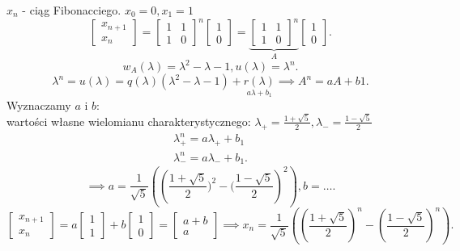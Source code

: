 \documentclass[../main.tex]{subfiles}
\begin{document}
\begin{przyklad}
    $x_n$ - ciąg Fibonacciego. $x_0 = 0, x_1 = 1$
    \[
    \begin{bmatrix}
    x_{n+1}\\
    x_{n}
\end{bmatrix} =
\begin{bmatrix}
1 & 1\\
1 & 0\end{bmatrix}^n
\begin{bmatrix}
1\\
0\end{bmatrix} =
\underbrace{
\begin{bmatrix}
1 & 1\\
1 & 0\end{bmatrix}^n}_{A}
\begin{bmatrix}
1\\
0\end{bmatrix}
    .\]
    \[
        w_A(\lambda) = \lambda^2 - \lambda - 1, u(\lambda) = \lambda^n
    .\]
    \[
        \lambda^n = u(\lambda) = q(\lambda)(\lambda^2 - \lambda - 1) + \underset{a\lambda+b_1}{r(\lambda)} \implies A^n = a A + b 1
    .\]
    Wyznaczamy $a$ i $b$:\\
    wartości własne wielomianu charakterystycznego: $\lambda_{+} = \frac{1+\sqrt{5}}{2}, \lambda_{-} = \frac{1-\sqrt{5}}{2}$ \\
    \begin{align*}
        \lambda_{+}^n = a \lambda_{+} + b_1\\
        \lambda_{-}^n = a \lambda_{-} + b_1
    .\end{align*} \[
        \implies a = \frac{1}{\sqrt{5} } \left ( \left (\frac{1+\sqrt{5} }{2})^2 - (\frac{1-\sqrt{5} }{2} \right )^2\right ), b = \ldots
    .\]
    \[
    \begin{bmatrix}
    x_{n+1}\\
    x_{n}
    \end{bmatrix} =
    a \begin{bmatrix}
    1\\
    1\end{bmatrix} + b \begin{bmatrix}
    1\\
    0\end{bmatrix} =
    \begin{bmatrix}
    a+b\\
a\end{bmatrix} \implies x_n = \frac{1}{\sqrt{5} }\left( \left( \frac{1+\sqrt{5}}{2}  \right)^n - \left( \frac{1-\sqrt{5} }{2} \right) ^n  \right)
    .\]
\end{przyklad}
\end{document}
